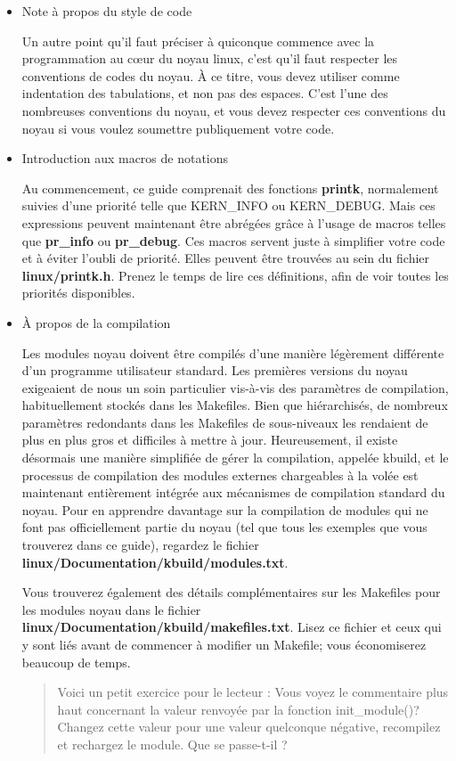 \documentclass[11pt]{article}
\begin{document}
\begin{itemize}
\item Note à propos du style de code
\label{sec-4-1-0-1}

Un autre point qu'il faut préciser à quiconque commence avec la programmation au cœur du noyau linux, c'est qu'il faut respecter les conventions de codes du noyau. À ce titre, vous devez utiliser comme indentation des tabulations, et non pas des espaces. C'est l'une des nombreuses conventions du noyau, et vous devez respecter ces conventions du noyau si vous voulez soumettre publiquement votre code.

\item Introduction aux macros de notations
\label{sec-4-1-0-2}

Au commencement, ce guide comprenait des fonctions \textbf{printk}, normalement suivies d'une priorité telle que KERN\_INFO ou KERN\_DEBUG. Mais ces expressions peuvent maintenant être abrégées grâce à l'usage de macros telles que \textbf{pr\_info} ou \textbf{pr\_debug}. Ces macros servent juste à simplifier votre code et à éviter l'oubli de priorité. Elles peuvent être trouvées au sein du fichier \textbf{linux/printk.h}. Prenez le temps de lire ces définitions, afin de voir toutes les priorités disponibles.

\item À propos de la compilation
\label{sec-4-1-0-3}

Les modules noyau doivent être compilés d'une manière légèrement différente d'un programme utilisateur standard. Les premières versions du noyau exigeaient de nous un soin particulier vis-à-vis des paramètres de compilation, habituellement stockés dans les Makefiles. Bien que hiérarchisés, de nombreux paramètres redondants dans les Makefiles de sous-niveaux les rendaient de plus en plus gros et difficiles à mettre à jour. Heureusement, il existe désormais une manière simplifiée de gérer la compilation, appelée kbuild, et le processus de compilation des modules externes chargeables à la volée est maintenant entièrement intégrée aux mécanismes de compilation standard du noyau. Pour en apprendre davantage sur la compilation de modules qui ne font pas officiellement partie du noyau (tel que tous les exemples que vous trouverez dans ce guide), regardez le fichier \textbf{linux/Documentation/kbuild/modules.txt}.

Vous trouverez également des détails complémentaires sur les Makefiles pour les modules noyau dans le fichier \textbf{linux/Documentation/kbuild/makefiles.txt}. Lisez ce fichier et ceux qui y sont liés avant de commencer à modifier un Makefile; vous économiserez beaucoup de temps.

\begin{quote}
Voici un petit exercice pour le lecteur : Vous voyez le commentaire plus haut concernant la valeur renvoyée par la fonction init\_module()? Changez cette valeur pour une valeur quelconque négative, recompilez et rechargez le module. Que se passe-t-il ?
\end{quote}
\end{itemize}
\end{document}
